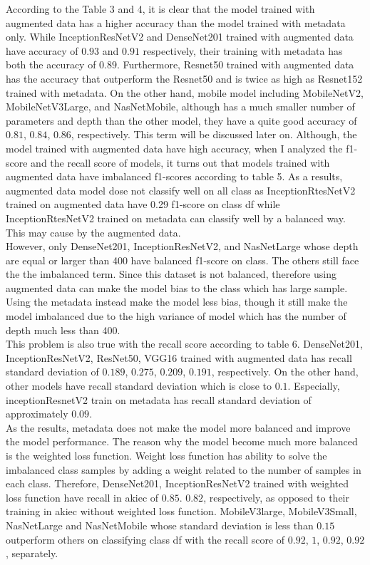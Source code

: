 According to the Table 3 and 4, it is clear that the model trained with augmented data has a higher accuracy than the model trained with metadata only.  While InceptionResNetV2 and DenseNet201 trained with augmented data have accuracy of $0.93$ and $0.91$ respectively, their training with metadata has both the accuracy of $0.89$. Furthermore, Resnet50 trained with augmented data has the accuracy that outperform the Resnet50 and is twice as high as Resnet152 trained with metadata. On the other hand, mobile model including MobileNetV2, MobileNetV3Large, and NasNetMobile, although has a much smaller number of parameters and depth than the other model, they have a quite good accuracy of $0.81$, $0.84$, $0.86$, respectively. This term will be discussed later on. Although, the model trained with augmented data have high accuracy, when I analyzed the f1-score and the recall score of models, it turns out that models trained with augmented data have imbalanced f1-scores according to table 5. As a results, augmented data model dose not classify well on all class as InceptionRtesNetV2 trained on augmented data have 0.29 f1-score on class df while InceptionRtesNetV2 trained on metadata can classify well by a balanced way. This may cause by the augmented data. \\
However, only DenseNet201, InceptionResNetV2, and NasNetLarge whose depth are equal or larger than 400 have balanced f1-score on class. The others still face the
the imbalanced term. Since this dataset is not balanced, therefore using augmented data can make the model bias to the class which has large sample. Using the metadata instead make the model less bias, though it still make the model imbalanced due to the high variance of model which has the number of depth much less than 400.\\ 
This problem is also true with the recall score according to table 6. DenseNet201, InceptionResNetV2, ResNet50, VGG16 trained with augmented data has recall standard deviation of $0.189$, $0.275$, $0.209$, $0.191$, respectively. On the other hand, other models have recall standard deviation which is close to $0.1$. Especially, inceptionResnetV2 train on metadata has recall standard deviation of approximately $0.09$. \\
As the results, metadata does not make the model more balanced and improve the model performance. The reason why the model become much more balanced is the weighted loss function. Weight loss function has ability to solve the imbalanced class samples by adding a weight related to the number of samples in each class. Therefore, DenseNet201, InceptionResNetV2 trained with weighted loss function have recall in akiec of $0.85$. $0.82$, respectively, as opposed to their training in akiec without weighted loss function. MobileV3large, MobileV3Small, NasNetLarge and NasNetMobile whose standard deviation is less than $0.15$ outperform others on classifying class df with the recall score of $0.92$, $1$, $0.92$, $0.92$, separately. 
